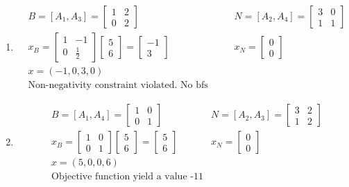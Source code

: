 \documentclass[11pt]{article}
\begin{document}
\begin{enumerate}
    \item \begin{align*}
        & B = [A_1, A_3]=\begin{bmatrix} 1 & 2 \\ 0 & 2\end{bmatrix} & N = [A_2, A_4]=\begin{bmatrix} 3 & 0 \\ 1 & 1\end{bmatrix} \\
        & x_B = \begin{bmatrix} 1 & -1 \\ 0 & \frac{1}{2}\end{bmatrix} \begin{bmatrix} 5 \\ 6 \end{bmatrix} = \begin{bmatrix} -1 \\ 3 \end{bmatrix} & x_N = \begin{bmatrix} 0 \\ 0\end{bmatrix} \\
        & x = (-1, 0, 3, 0) &\\
        & \text{Non-negativity constraint violated. No bfs generated.} &
    \end{align*}
    
    \item \begin{align*}
        & B = [A_1, A_4] = \begin{bmatrix} 1 & 0 \\ 0 & 1\end{bmatrix}& N = [A_2, A_3] =\begin{bmatrix} 3 & 2 \\ 1 & 2\end{bmatrix}\\    
        & x_B = \begin{bmatrix} 1 & 0 \\ 0 & 1\end{bmatrix} \begin{bmatrix} 5 \\ 6 \end{bmatrix} = \begin{bmatrix} 5 \\ 6 \end{bmatrix} & x_N = \begin{bmatrix} 0 \\ 0\end{bmatrix} \\
        & x = (5, 0, 0, 6) & \\
        & \text{Objective function yield a value -11} &
    \end{align*}
    

\end{enumerate}
\end{document}
